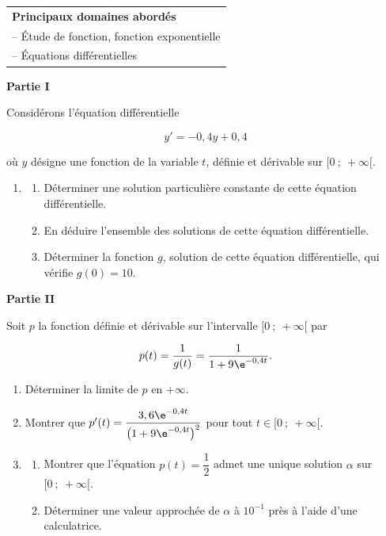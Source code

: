 \medskip

\begin{tabular}{|l|}\hline
\textbf{Principaux domaines abordés}\\
-- Étude de fonction, fonction exponentielle\\
-- Équations différentielles\\ \hline
\end{tabular}

\bigskip

\textbf{Partie I}

\medskip

Considérons l'équation différentielle

\[y'= -0,4y + 0,4\]

où $y$ désigne une fonction de la variable $t$, définie et dérivable sur $[0~;~ + \infty[$.

\medskip

\begin{enumerate}
\item 
	\begin{enumerate}
		\item Déterminer une solution particulière constante de cette équation différentielle. 
		\item En déduire l'ensemble des solutions de cette équation différentielle.
\item Déterminer la fonction $g$, solution de cette équation différentielle, qui vérifie $g(0) = 10$.
	\end{enumerate}
\end{enumerate}

\bigskip

\textbf{Partie II}

\medskip

Soit $p$ la fonction définie et dérivable sur l'intervalle $[0~;~+ \infty[$ par 

\[p(t) = \dfrac{1}{g(t)} = \dfrac{1}{1 + 9\e^{-0,4t}}.\]

\smallskip

\begin{enumerate}
\item Déterminer la limite de $p$ en $+ \infty$. 
\item Montrer que $p'(t) = \dfrac{3,6\e^{-0,4t}}{ \left(1 + 9\e^{-0,4t}\right)^2}$ pour tout $t \in  [0~;~+ \infty[$.

\item  
	\begin{enumerate}
		\item Montrer que l'équation $p(t) = \dfrac{1}{2}$ admet une unique solution $\alpha$ sur $[0~;~+ \infty[$. 
		\item Déterminer une valeur approchée de $\alpha$ à $10^{-1}$ près à l'aide d'une calculatrice.
	\end{enumerate}
\end{enumerate}

